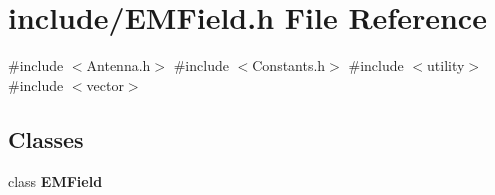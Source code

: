\section{include/\+E\+M\+Field.h File Reference}
\label{_e_m_field_8h}
{\ttfamily \#include $<$Antenna.\+h$>$}\newline
{\ttfamily \#include $<$Constants.\+h$>$}\newline
{\ttfamily \#include $<$utility$>$}\newline
{\ttfamily \#include $<$vector$>$}\newline
\subsection*{Classes}
\begin{DoxyCompactItemize}
\item 
class \textbf{ E\+M\+Field}
\end{DoxyCompactItemize}
